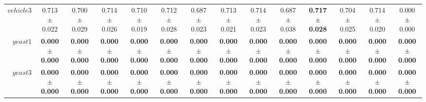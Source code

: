 \begin{table}[!ht]
{\begin{tabular}{r c c c c c c c c c c c c c}
$vehicle3$ & 0.713 $\pm$ 0.022 & 0.700 $\pm$ 0.029 & 0.714 $\pm$ 0.026 & 0.710 $\pm$ 0.019 & 0.712 $\pm$ 0.028 & 0.687 $\pm$ 0.023 & 0.713 $\pm$ 0.021 & 0.714 $\pm$ 0.023 & 0.687 $\pm$ 0.038 & \textbf{0.717 $\pm$ 0.028} & 0.704 $\pm$ 0.025 & 0.714 $\pm$ 0.020 & 0.000 $\pm$ 0.000 \\
$yeast1$ & \textbf{0.000 $\pm$ 0.000} & \textbf{0.000 $\pm$ 0.000} & \textbf{0.000 $\pm$ 0.000} & \textbf{0.000 $\pm$ 0.000} & \textbf{0.000 $\pm$ 0.000} & \textbf{0.000 $\pm$ 0.000} & \textbf{0.000 $\pm$ 0.000} & \textbf{0.000 $\pm$ 0.000} & \textbf{0.000 $\pm$ 0.000} & \textbf{0.000 $\pm$ 0.000} & \textbf{0.000 $\pm$ 0.000} & \textbf{0.000 $\pm$ 0.000} & \textbf{0.000 $\pm$ 0.000} \\
$yeast3$ & \textbf{0.000 $\pm$ 0.000} & \textbf{0.000 $\pm$ 0.000} & \textbf{0.000 $\pm$ 0.000} & \textbf{0.000 $\pm$ 0.000} & \textbf{0.000 $\pm$ 0.000} & \textbf{0.000 $\pm$ 0.000} & \textbf{0.000 $\pm$ 0.000} & \textbf{0.000 $\pm$ 0.000} & \textbf{0.000 $\pm$ 0.000} & \textbf{0.000 $\pm$ 0.000} & \textbf{0.000 $\pm$ 0.000} & \textbf{0.000 $\pm$ 0.000} & \textbf{0.000 $\pm$ 0.000} \\
\end{tabular}}
\end{table}
